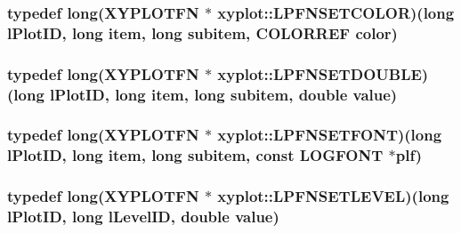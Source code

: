 \hypertarget{namespacexyplot_ac41175dc795758950c58e18d1660faa5}{
\subsubsection[{L\-P\-F\-N\-S\-E\-T\-C\-O\-L\-O\-R}]{\setlength{\rightskip}{0pt plus 5cm}typedef {\bf long}({\bf X\-Y\-P\-L\-O\-T\-F\-N} $\ast$ xyplot\-::\-L\-P\-F\-N\-S\-E\-T\-C\-O\-L\-O\-R)({\bf long} l\-Plot\-I\-D, {\bf long} item, {\bf long} subitem, C\-O\-L\-O\-R\-R\-E\-F color)}}\label{namespacexyplot_ac41175dc795758950c58e18d1660faa5}
\hypertarget{namespacexyplot_acc2b15a223e822003ec2f51071dd16b2}{
\subsubsection[{L\-P\-F\-N\-S\-E\-T\-D\-O\-U\-B\-L\-E}]{\setlength{\rightskip}{0pt plus 5cm}typedef {\bf long}({\bf X\-Y\-P\-L\-O\-T\-F\-N} $\ast$ xyplot\-::\-L\-P\-F\-N\-S\-E\-T\-D\-O\-U\-B\-L\-E)({\bf long} l\-Plot\-I\-D, {\bf long} item, {\bf long} subitem, double value)}}\label{namespacexyplot_acc2b15a223e822003ec2f51071dd16b2}
\hypertarget{namespacexyplot_a28e8fe476dccb830b8c9557e0f802263}{
\subsubsection[{L\-P\-F\-N\-S\-E\-T\-F\-O\-N\-T}]{\setlength{\rightskip}{0pt plus 5cm}typedef {\bf long}({\bf X\-Y\-P\-L\-O\-T\-F\-N} $\ast$ xyplot\-::\-L\-P\-F\-N\-S\-E\-T\-F\-O\-N\-T)({\bf long} l\-Plot\-I\-D, {\bf long} item, {\bf long} subitem, const L\-O\-G\-F\-O\-N\-T $\ast$plf)}}\label{namespacexyplot_a28e8fe476dccb830b8c9557e0f802263}
\hypertarget{namespacexyplot_ae4a8b61fef16cdd55e9491d30f602509}{
\subsubsection[{L\-P\-F\-N\-S\-E\-T\-L\-E\-V\-E\-L}]{\setlength{\rightskip}{0pt plus 5cm}typedef {\bf long}({\bf X\-Y\-P\-L\-O\-T\-F\-N} $\ast$ xyplot\-::\-L\-P\-F\-N\-S\-E\-T\-L\-E\-V\-E\-L)({\bf long} l\-Plot\-I\-D, {\bf long} l\-Level\-I\-D, double value)}}\label{namespacexyplot_ae4a8b61fef16cdd55e9491d30f602509}
